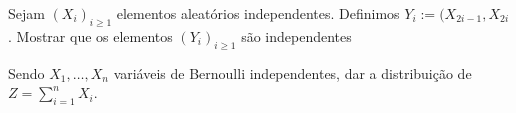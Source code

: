 \begin{exercise}
  Sejam $(X_i)_{i \geq 1}$  elementos aleatórios independentes. Definimos $Y_i:=(X_{2i-1},X_{2i}$.
  Mostrar que os elementos $(Y_i)_{i\ge 1}$ são independentes

  \end{exercise}



\begin{exercise}
  Sendo $X_1,\dots, X_n$ variáveis de Bernoulli independentes, dar a distribuição de $Z=\sum_{i=1}^n X_i$.
\end{exercise}






